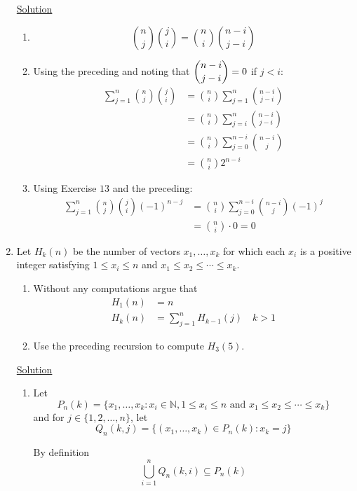 \begin{enumerate}
\underline{Solution}

\begin{enumerate}
\item \[\binom{n}{j}\binom{j}{i} = \binom{n}{i}\binom{n-i}{j-i}\]
\item Using the preceding and noting that $\dbinom{n-i}{j-i} = 0$ if $j < i$:
\begin{align*}
\sum_{j=1}^n\binom{n}{j}\binom{j}{i} &=
\binom{n}{i}\sum_{j=1}^n\binom{n-i}{j-i} \\
&= \binom{n}{i}\sum_{j=i}^n\binom{n-i}{j-i} \\
&= \binom{n}{i}\sum_{j=0}^{n-i}\binom{n-i}{j} \\
&= \binom{n}{i}2^{n-i}
\end{align*}
\item Using Exercise $13$ and the preceding:
\begin{align*}
\sum_{j=1}^n\binom{n}{j}\binom{j}{i}(-1)^{n-j} &=
\binom{n}{i}\sum_{j=0}^{n-i}\binom{n-i}{j}(-1)^{j} \\
&= \binom{n}{i} \cdot 0 = 0
\end{align*}
\end{enumerate}

\item Let $H_k(n)$ be the number of vectors $x_1, \dots, x_k$ for which each 
$x_i$ is a positive integer satisfying $1 \le x_i \le n$ and
$x_1 \le x_2 \le \cdots \le x_k$.

\begin{enumerate}
\item Without any computations argue that
\begin{align*}
H_1(n) &= n \\
H_k(n) &= \sum_{j=1}^nH_{k-1}(j) \quad k > 1
\end{align*} 
\item Use the preceding recursion to compute $H_3(5)$.
\end{enumerate}

\underline{Solution}

\begin{enumerate}
\item Let
\[P_n(k) = \{x_1,\dots, x_k : x_i \in \mathbb{N}, 1 \le x_i \le n \mbox{ and }
x_1 \le x_2 \le \cdots \le x_k \}\]
and for $j \in \{1, 2, \dots, n\}$, let
\[Q_n(k,j) = \{(x_1,\dots, x_k) \in P_n(k) : x_k = j\}\]

By definition
\[\bigcup_{i=1}^nQ_n(k,i) \subseteq P_n(k)\]


\end{enumerate}
\end{enumerate}
